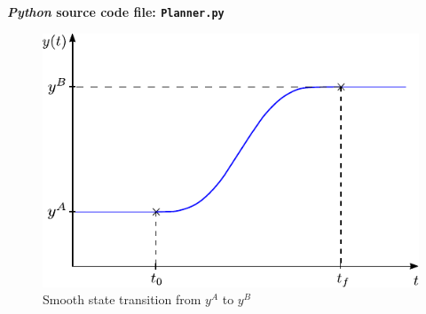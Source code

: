 \documentclass[a4paper,11pt,headings=standardclasses,parskip=half]{scrartcl}
\newcommand{\py}{\emph{Python}\xspace}
\begin{document}
\textbf{\py source code file: \texttt{Planner.py}}
\begin{figure}[ht]
\centering
\includegraphics[scale=1]{img/state_transition.pdf}
\caption{Smooth state transition from $y^A$ to $y^B$}
\end{figure}
\end{document}
